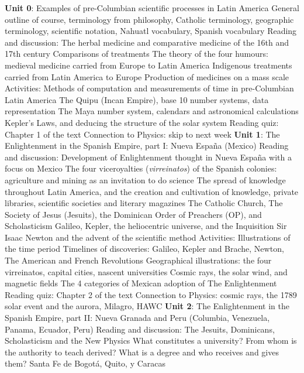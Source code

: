 \documentclass[10pt]{article}
\begin{document}
\begin{outline}[enumerate]
\1 \textbf{Unit 0}: Examples of pre-Columbian scientific processes in Latin America
\2 General outline of course, terminology from philosophy, Catholic terminology, geographic terminology, scientific notation, Nahuatl vocabulary, Spanish vocabulary
\2 Reading and discussion: The herbal medicine and comparative medicine of the 16th and 17th century
\3 Comparisons of treatments
\3 The theory of the four humours: medieval medicine carried from Europe to Latin America
\3 Indigenous treatments carried from Latin America to Europe
\3 Production of medicines on a mass scale
\2 Activities: Methods of computation and measurements of time in pre-Columbian Latin America
\3 The Quipu (Incan Empire), base 10 number systems, data representation
\3 The Maya number system, calendars and astronomical calculations
\3 Kepler's Laws, and deducing the structure of the solar system
\2 Reading quiz: Chapter 1 of the text
\2 Connection to Physics: skip to next week
\1 \textbf{Unit 1}: The Enlightenment in the Spanish Empire, part I: Nueva Espa\~{n}a (Mexico)
\2 Reading and discussion: Development of Enlightenment thought in Nueva Espa\~{n}a with a focus on Mexico
\3 The four viceroyalties (\textit{virreinatos}) of the Spanish colonies: agriculture and mining as an invitation to do science
\3 The spread of knowledge throughout Latin America, and the creation and cultivation of knowledge, private libraries, scientific societies and literary magazines
\3 The Catholic Church, The Society of Jesus (Jesuits), the Dominican Order of Preachers (OP), and Scholasticism
\3 Galileo, Kepler, the heliocentric universe, and the Inquisition
\3 Sir Isaac Newton and the advent of the scientific method
\2 Activities: Illustrations of the time period
\3 Timelines of discoveries: Galileo, Kepler and Brache, Newton, The American and French Revolutions
\3 Geographical illustrations: the four virreinatos, capital cities, nascent universities
\3 Cosmic rays, the solar wind, and magnetic fields
\3 The 4 categories of Mexican adoption of The Enlightenment
\2 Reading quiz: Chapter 2 of the text
\2 Connection to Physics: cosmic rays, the 1789 solar event and the aurora, Milagro, HAWC
\1 \textbf{Unit 2}: The Enlightenment in the Spanish Empire, part II: Nueva Granada and Peru (Columbia, Venezuela, Panama, Ecuador, Peru)
\2 Reading and discussion: The Jesuits, Dominicans, Scholasticism and the New Physics
\3 What constitutes a university?  From whom is the authority to teach derived?  What is a degree and who receives and gives them?
\3 Santa Fe de Bogot\'{a}, Quito, y Caracas

\end{outline}
\end{document}
